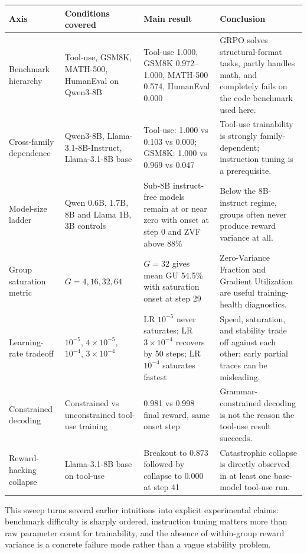 \small
\begin{center}
\begin{tabularx}{\textwidth}{L{2.5cm}L{3.0cm}L{2.6cm}Y}
\toprule
Axis & Conditions covered & Main result & Conclusion \\
\midrule
Benchmark hierarchy & Tool-use, GSM8K, MATH-500, HumanEval on Qwen3-8B & Tool-use 1.000, GSM8K 0.972--1.000, MATH-500 0.574, HumanEval 0.000 & GRPO solves structural-format tasks, partly handles math, and completely fails on the code benchmark used here. \\
Cross-family dependence & Qwen3-8B, Llama-3.1-8B-Instruct, Llama-3.1-8B base & Tool-use: 1.000 vs 0.103 vs 0.000; GSM8K: 1.000 vs 0.969 vs 0.047 & Tool-use trainability is strongly family-dependent; instruction tuning is a prerequisite. \\
Model-size ladder & Qwen 0.6B, 1.7B, 8B and Llama 1B, 3B controls & Sub-8B instruct-free models remain at or near zero with onset at step 0 and ZVF above 88\% & Below the 8B-instruct regime, groups often never produce reward variance at all. \\
Group saturation metric & $G=4,16,32,64$ & $G=32$ gives mean GU 54.5\% with saturation onset at step 29 & Zero-Variance Fraction and Gradient Utilization are useful training-health diagnostics. \\
Learning-rate tradeoff & $10^{-5}$, $4\times10^{-5}$, $10^{-4}$, $3\times10^{-4}$ & LR $10^{-5}$ never saturates; LR $3\times10^{-4}$ recovers by 50 steps; LR $10^{-4}$ saturates fastest & Speed, saturation, and stability trade off against each other; early partial traces can be misleading. \\
Constrained decoding & Constrained vs unconstrained tool-use training & 0.981 vs 0.998 final reward, same onset step & Grammar-constrained decoding is not the reason the tool-use result succeeds. \\
Reward-hacking collapse & Llama-3.1-8B base on tool-use & Breakout to 0.873 followed by collapse to 0.000 at step 41 & Catastrophic collapse is directly observed in at least one base-model tool-use run. \\
\bottomrule
\end{tabularx}
\end{center}
\normalsize

This sweep turns several earlier intuitions into explicit experimental claims:
benchmark difficulty is sharply ordered, instruction tuning matters more than
raw parameter count for trainability, and the absence of within-group reward
variance is a concrete failure mode rather than a vague stability problem.

